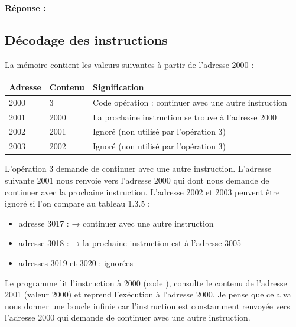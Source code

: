 
\begin{graybox}
    \textbf{Réponse :}

    \subsection{Décodage des instructions}

    La mémoire contient les valeurs suivantes à partir de l'adresse 2000 :

    \begin{center}
        \begin{tabular}{lll}
            \hline
            \textbf{Adresse} & \textbf{Contenu} & \textbf{Signification} \\
            \hline
            2000 & 3    & Code opération : continuer avec une autre instruction \\
            2001 & 2000 & La prochaine instruction se trouve à l'adresse 2000 \\
            2002 & 2001 & Ignoré (non utilisé par l'opération 3) \\
            2003 & 2002 & Ignoré (non utilisé par l'opération 3) \\
            \hline
        \end{tabular}
    \end{center}
    
    L’opération 3 demande de continuer avec une autre instruction. L’adresse suivante 2001 nous 
    renvoie vers l’adresse 2000 qui dont nous demande de continuer avec la prochaine instruction. 
    L’adresse 2002 et 2003 peuvent être ignoré si l’on compare au tableau 1.3.5 : 

    \begin{itemize}
        \item adresse 3017 :  → continuer avec une autre instruction
        \item adresse 3018 :  → la prochaine instruction est à l'adresse 3005
        \item adresses 3019 et 3020 : ignorées
    \end{itemize}

    Le programme lit l'instruction à 2000 (code ), consulte le contenu
    de l'adresse 2001 (valeur 2000) et reprend l'exécution à l'adresse 2000.    
    Je pense que cela va nous donner une boucle infinie car l’instruction est constamment 
    renvoyée vers l’adresse 2000 qui demande de continuer avec une autre instruction. 



\end{graybox}
